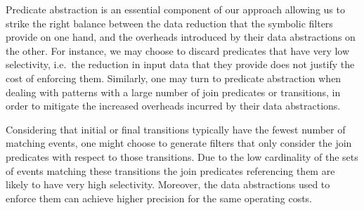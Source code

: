Predicate abstraction is an essential component of our approach
allowing us to strike the right balance between the data reduction that the
symbolic filters provide on one hand, and the overheads introduced by their
data abstractions on the other.
For instance, we may choose to discard
predicates that have very low selectivity, i.e.\ the reduction in input data
that they provide does not justify the cost of enforcing them.
Similarly, one may turn to predicate abstraction when dealing with patterns with
a large number of join predicates or transitions, in order to mitigate the
increased overheads incurred by their data abstractions.

Considering that initial or final transitions typically have the fewest
number of matching events, one might choose to generate filters that only
consider the join predicates with respect to those transitions.
Due to the low cardinality of the sets of events matching these transitions 
the join predicates referencing them are likely to have very high selectivity.
Moreover, the data abstractions used to enforce them can achieve higher
precision for the same operating costs.












 
